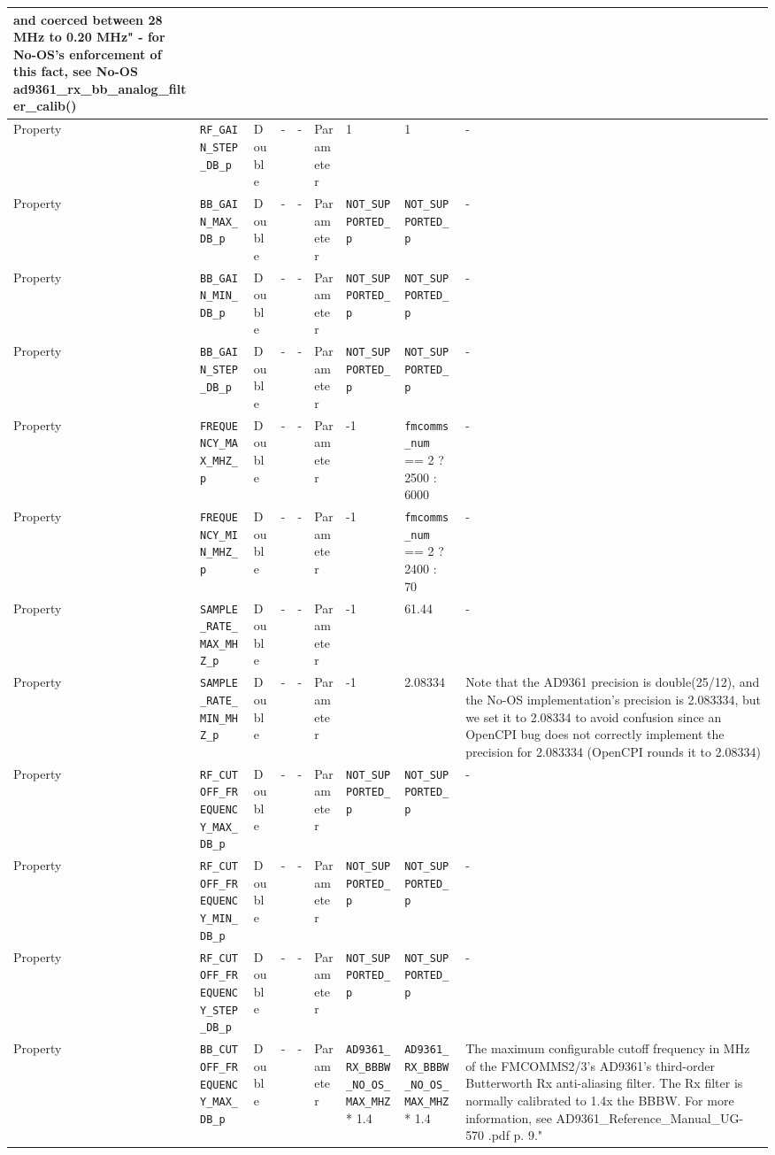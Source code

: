 \documentclass{article}
\begin{document}
\begin{landscape}
\begin{scriptsize}
\begin{longtable}{|p{1.8cm}|p{4.1cm}|p{1cm}|c|c|p{1.6cm}|p{3.7cm}|p{3.7cm}|p{2.5cm}|}
        and coerced between 28 MHz to 0.20 MHz" - for No-OS's enforcement of
        this fact, see No-OS ad9361\_rx\_bb\_analog\_filter\_calib()  \\
			\hline
			Property     & \verb+RF_GAIN_STEP_DB_p+ & Double & -       & -          & Parameter & 1 & 1 & - \\
			\hline
			Property     & \verb+BB_GAIN_MAX_DB_p+ & Double & -       & -          & Parameter & \verb+NOT_SUPPORTED_p+ & \verb+NOT_SUPPORTED_p+ & - \\
			\hline
			Property     & \verb+BB_GAIN_MIN_DB_p+ & Double & -       & -          & Parameter & \verb+NOT_SUPPORTED_p+ & \verb+NOT_SUPPORTED_p+ & - \\
			\hline
			Property     & \verb+BB_GAIN_STEP_DB_p+ & Double & -       & -          & Parameter & \verb+NOT_SUPPORTED_p+ & \verb+NOT_SUPPORTED_p+ & - \\
			\hline
			Property     & \verb+FREQUENCY_MAX_MHZ_p+                   & Double&-        & -          & Parameter & -1 & \verb+fmcomms_num+ == 2 ? 2500 : 6000 & - \\
			\hline
			Property     & \verb+FREQUENCY_MIN_MHZ_p+                   & Double&-        & -          & Parameter & -1 & \verb+fmcomms_num+ == 2 ? 2400 : 70 & - \\
			\hline
			Property     & \verb+SAMPLE_RATE_MAX_MHZ_p+                   & Double&-        & -          & Parameter & -1 & 61.44 & - \\
			\hline
			Property     & \verb+SAMPLE_RATE_MIN_MHZ_p+                   & Double&-        & -          & Parameter & -1 & 2.08334 & Note that the AD9361 precision is double(25/12), and the No-OS implementation's precision is 2.083334, but we set it to 2.08334 to avoid confusion since an OpenCPI bug does not correctly implement the precision for 2.083334 (OpenCPI rounds it to 2.08334) \\
			\hline
			Property     & \verb+RF_CUTOFF_FREQUENCY_MAX_DB_p+ & Double & -       & -          & Parameter & \verb+NOT_SUPPORTED_p+ & \verb+NOT_SUPPORTED_p+ & - \\
			\hline
			Property     & \verb+RF_CUTOFF_FREQUENCY_MIN_DB_p+ & Double & -       & -          & Parameter & \verb+NOT_SUPPORTED_p+ & \verb+NOT_SUPPORTED_p+ & - \\
			\hline
			Property     & \verb+RF_CUTOFF_FREQUENCY_STEP_DB_p+ & Double & -       & -          & Parameter & \verb+NOT_SUPPORTED_p+ & \verb+NOT_SUPPORTED_p+ & - \\
			\hline
			Property     & \verb+BB_CUTOFF_FREQUENCY_MAX_DB_p+ & Double & -       & -          & Parameter & \verb+AD9361_RX_BBBW_NO_OS_MAX_MHZ+ * 1.4 & \verb+AD9361_RX_BBBW_NO_OS_MAX_MHZ+ * 1.4 & 
The maximum configurable cutoff frequency in MHz of the FMCOMMS2/3's AD9361's third-order Butterworth Rx anti-aliasing filter. The Rx filter is normally calibrated to 1.4x the BBBW. For more information, see AD9361\_Reference\_Manual\_UG-570    .pdf p. 9."
			

\end{longtable}
\end{scriptsize}
\end{landscape}
\end{document}
